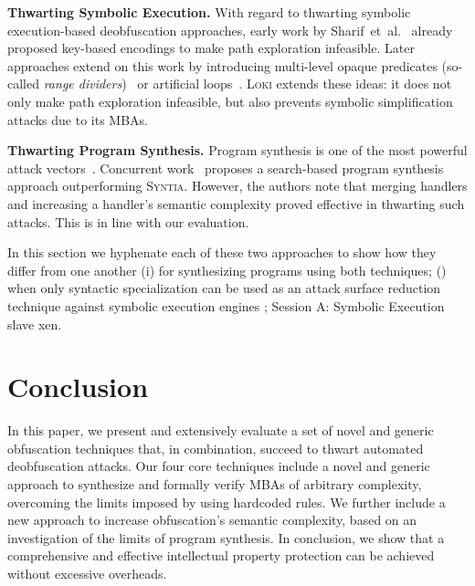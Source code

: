 \documentclass[letterpaper,twocolumn,10pt]{article}
\newcommand{\etal}{et~al.\xspace}
\theoremstyle{customexample}
\theoremstyle{customexperiment}
\newcommand{\loki}{\textsc{Loki}\xspace}
\newcommand{\syntia}{\textsc{Syntia}\xspace}
\begin{document}
\textbf{Thwarting Symbolic Execution.}
With regard to thwarting symbolic execution-based deobfuscation approaches, early work by Sharif~\etal~\cite{sharif2008impeding} already proposed key-based encodings to make path exploration infeasible. Later approaches extend on this work by introducing multi-level opaque predicates (so-called \emph{range dividers})~\cite{banescu2016code} or artificial loops~\cite{ollivier2019howto}.
\loki extends these ideas: it does not only make path exploration infeasible, but also prevents symbolic simplification attacks due to its MBAs.

\textbf{Thwarting Program Synthesis.}
Program synthesis is one of the most powerful attack vectors~\cite{blazytko2017syntia,menguy2021xyntia}. 
Concurrent work~\cite{menguy2021xyntia} proposes a search-based program synthesis approach outperforming \syntia. However, the authors note that merging handlers and increasing a handler's semantic complexity proved effective in thwarting such attacks. This is in line with our evaluation.









 In this section we hyphenate each of these two approaches to show how they differ from one another (i) for synthesizing programs using both techniques; () when only syntactic specialization can be used as an attack surface reduction technique against symbolic execution engines ; Session A: Symbolic Execution slave xen.
\section{Conclusion}

In this paper, we present and extensively evaluate a set of novel and generic obfuscation techniques that, in combination, succeed to thwart automated deobfuscation attacks. Our four core techniques include a novel and generic approach to synthesize and formally verify MBAs of arbitrary complexity, overcoming the limits imposed by using hardcoded rules. We further include a new approach to increase obfuscation's semantic complexity, based on an investigation of the limits of program synthesis.
In conclusion, we show that a comprehensive and effective intellectual property protection can be achieved without excessive overheads.
 




\end{document}
